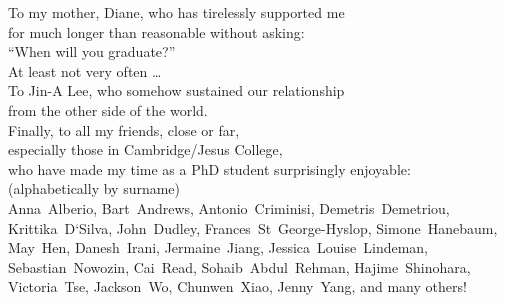 
\begin{dedication}
To my mother, Diane, who has tirelessly supported me\\
for much longer than reasonable without asking:\\
``When will you graduate?''\\
At least not very often \ldots{}\\
\vspace{0.33\textheight minus 10ex}
To Jin-A Lee, who somehow sustained our relationship\\
from the other side of the world.\\
\vspace{0.11\textheight minus 10ex}
Finally, to all my friends, close or far,\\
especially those in Cambridge/Jesus College,\\
who have made my time as a PhD student surprisingly enjoyable:\\
\vspace{1em}
{\small(alphabetically by surname)}\\
\vspace{0.5em}
Anna~Alberio,
Bart~Andrews,
Antonio~Criminisi,
Demetris~Demetriou,
Krittika~D`Silva,
John~Dudley,
Frances~St~George-Hyslop,
Simone~Hanebaum,
May~Hen,
Danesh~Irani,
Jermaine~Jiang,
Jessica~Louise~Lindeman,
Sebastian~Nowozin,
Cai~Read,
Sohaib~Abdul~Rehman,
Hajime~Shinohara,
Victoria~Tse,
Jackson~Wo,
Chunwen~Xiao,
Jenny~Yang,
and many others!
\end{dedication}